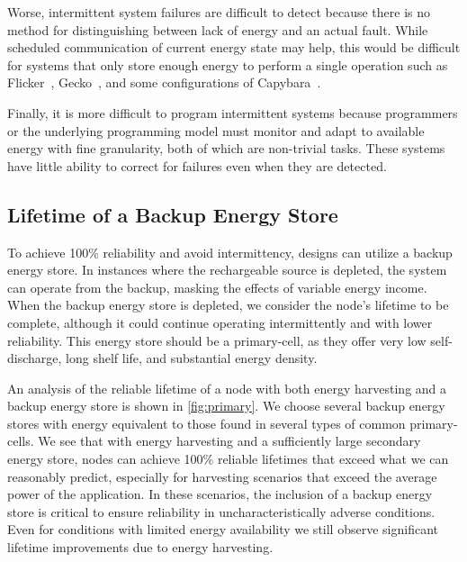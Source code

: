 Worse, intermittent system failures are difficult to detect %
because there is no method for distinguishing between lack of energy
and an actual fault. While scheduled communication of current energy state
may help, this would be difficult for systems that only store enough
energy to perform a single operation such as Flicker~\cite{hesterFlicker17},
Gecko~\cite{yervaGrafting12}, and some configurations of
Capybara~\cite{colinReconfigurable18}.

Finally, it is more difficult
to program intermittent systems because programmers or the underlying
programming model must monitor and adapt to available energy with fine
granularity, both of which are non-trivial tasks.
These systems have little ability to correct for failures
even when they are detected.

\subsection{Lifetime of a Backup Energy Store}
\label{sec:primary:lifetime}

To achieve 100\% reliability and avoid intermittency,
designs can utilize a backup energy store.
In instances where the rechargeable source is depleted, the system
can operate from the backup, masking the effects of variable energy income.
When the backup energy store is depleted, we consider the node's lifetime
to be complete, although it could continue
operating intermittently and with lower reliability. This energy store should
be a primary-cell, as they offer very low self-discharge, long shelf life, and
substantial energy density.

An analysis of the reliable lifetime of a node with both energy
harvesting and a backup energy store is shown in \cref{fig:primary}.
We choose several backup energy
stores with energy equivalent to those found in several types of common
primary-cells. We see that with energy harvesting and a sufficiently
large secondary energy store, nodes can
achieve 100\% reliable lifetimes that exceed
what we can reasonably predict, especially for harvesting scenarios that
exceed the average power of the application. In these scenarios, %
the inclusion of a backup energy store is critical %
to ensure reliability in uncharacteristically adverse conditions.
Even for conditions with
limited energy availability we still observe significant lifetime improvements
due to energy harvesting.

